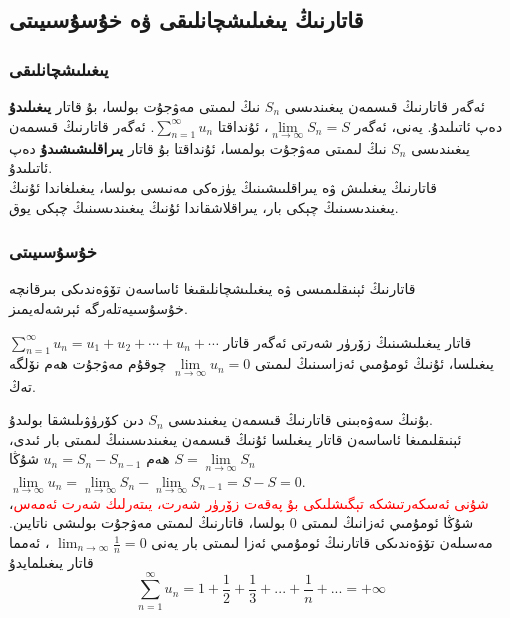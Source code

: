 \subsection{قاتارنىڭ يىغىلىشچانلىقى ۋە خۇسۇسىيىتى}

\subsubsection{يىغىلىشچانلىقى}
ئەگەر قاتارنىڭ قىسمەن يىغىندىسى $S_n$ نىڭ لىمىتى مەۋجۇت بولسا، بۇ قاتار \textbf{يىغىلىدۇ} دەپ ئاتىلىدۇ. يەنى، ئەگەر $\lim\limits_{n\to\infty}S_n=S$، ئۇنداقتا $\sum\limits_{n=1}^\infty u_n$. 
ئەگەر قاتارنىڭ قىسمەن يىغىندىسى $S_n$ نىڭ لىمىتى مەۋجۇت بولمسا، ئۇنداقتا بۇ قاتار \textbf{يىراقلىشىشىدۇ} دەپ ئاتىلىدۇ.\\
قاتارنىڭ يىغىلىش ۋە يىراقلىىشىنىڭ يۈزەكى مەنىسى بولسا، يىغىلغاندا ئۇنىڭ يىغىندىسىنىڭ چېكى بار، يىراقلاشقاندا ئۇنىڭ يىغىندىسىنىڭ چېكى يوق.
\subsubsection{خۇسۇسىيىتى}
قاتارنىڭ ئېنىقلىمىسى ۋە يىغىلىشچانلىقىغا ئاساسەن تۆۋەندىكى بىرقانچە خۇسۇسىيەتلەرگە ئېرشەلەيمىز.
\begin{WhiteRule}{قاتار يىغىلىشىنىڭ زۆرۈر شەرتى}{}%
ئەگەر قاتار 
$\sum\limits_{n=1}^\infty u_n=u_1+u_2+\cdots+u_n+\cdots$
 يىغىلسا، ئۇنىڭ ئومۇمىي ئەزاسىنىڭ لىمىتى 
$\lim\limits_{n \to \infty}u_n = 0$
 چوقۇم مەۋجۇت ھەم نۆلگە تەڭ.
\end{WhiteRule}
بۇنىڭ سەۋەبىنى قاتارنىڭ قىسمەن يىغىندىسى $S_n$ دىن كۆرۈۋىلىشقا بولىدۇ.\\
ئېنىقلىمىغا ئاساسەن قاتار يىغىلسا ئۇنىڭ قىسمەن يىغىندىسىنىڭ لىمىتى بار ئىدى،
$S = \lim\limits_{n \to \infty}S_n$
 ھەم
$u_n = S_n - S_{n-1}$
شۇڭا 
$\lim\limits_{n \to \infty}u_n = \lim\limits_{n \to \infty}S_n - \lim\limits_{n \to \infty}S_{n-1} = S-S=0$.\\
\textcolor{red}{شۇنى ئەسكەرتىشكە تېگىشلىكى بۇ پەقەت زۆرۈر شەرت، يىتەرلىك شەرت ئەمەس}، شۇڭا ئومۇمىي ئەزانىڭ لىمىتى $0$ بولسا، قاتارنىڭ لىمىتى مەۋجۇت بولىشى ناتايىن. مەسىلەن تۆۋەندىكى قاتارنىڭ ئومۇمىي ئەزا لىمىتى بار يەنى 
$
\lim_{n \to \infty} \frac{1}{n} = 0
$
، ئەمما قاتار يىغىلمايدۇ
$$
\sum\limits_{n=1}^\infty u_n = 1+\frac{1}{2}+\frac{1}{3}+...+\frac{1}{n}+... = +\infty
$$

